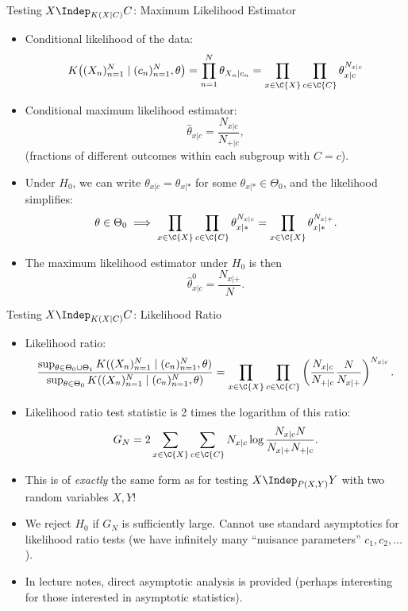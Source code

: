 \begin{frame}{Testing $X \Indep_{K(X|C)} C$: Maximum Likelihood Estimator}
  \begin{itemize}
    \item Conditional likelihood of the data:
      $$K\big((X_n)_{n=1}^N \mid (c_n)_{n=1}^N, \theta\big)
      = \prod_{n=1}^N \theta_{X_n|c_n} 
      = \prod_{x\in\C{X}} \prod_{c\in\C{C}} \theta_{x|c}^{N_{x|c}}$$
    \item Conditional maximum likelihood estimator:
      $$\hat \theta_{x|c} = \frac{N_{x|c}}{N_{+|c}},$$
      (fractions of different outcomes within each subgroup with $C = c$).
    \item Under $H_0$, we can write $\theta_{x|c} = \theta_{x|\ast}$ for some $\theta_{x|\ast} \in \Theta_0$, 
      and the likelihood simplifies:
      $$\theta \in \Theta_0 \implies \prod_{x\in\C{X}} \prod_{c\in\C{C}} \theta_{x|\ast}^{N_{x|c}} = \prod_{x\in\C{X}} \theta_{x|\ast}^{N_{x|+}}.$$
    \item The maximum likelihood estimator under $H_0$ is then
$$\hat \theta^0_{x|c} = \frac{N_{x|+}}{N}.$$
  \end{itemize}
\end{frame}
 
\begin{frame}{Testing $X \Indep_{K(X|C)} C$: Likelihood Ratio}
  \begin{itemize}
    \item Likelihood ratio:
\begin{equation*}
  \frac{\sup_{\theta\in\Theta_0 \cup \Theta_1} K((X_n)_{n=1}^N \mid (c_n)_{n=1}^N, \theta)}{\sup_{\theta\in\Theta_0} K((X_n)_{n=1}^N \mid (c_n)_{n=1}^N, \theta)}
= \prod_{x\in\C{X}} \prod_{c\in\C{C}} \left(\frac{N_{x|c}}{N_{+|c}} \frac{N}{N_{x|+}}\right)^{N_{x|c}}.
\end{equation*}
    \item Likelihood ratio test statistic is 2 times the logarithm of this ratio:
$$G_N = 2 \sum_{x\in\C{X}} \sum_{c\in\C{C}} N_{x|c} \log \frac{N_{x|c} N}{N_{x|+} N_{+|c}}.$$
    \item This is of \emph{exactly} the same form as for testing $X \Indep_{P(X,Y)} Y$ with two random variables $X,Y$!
    \item We reject $H_0$ if $G_N$ is sufficiently large.
      Cannot use standard asymptotics for likelihood ratio tests (we have infinitely many ``nuisance parameters'' $c_1,c_2,\dots$).
    \item In lecture notes, direct asymptotic analysis is provided (perhaps interesting for those interested in asymptotic statistics).
  \end{itemize}
\end{frame}

